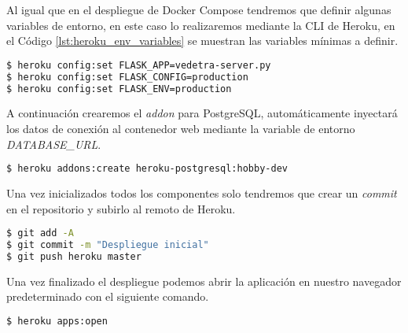 \documentclass[../proyecto.tex]{subfiles}
\begin{document}
Al igual que en el despliegue de Docker Compose tendremos que definir algunas variables de entorno, en este caso lo realizaremos mediante la CLI de Heroku, en el Código \ref{lst:heroku_env_variables} se muestran las variables mínimas a definir.\\

\begin{minipage}{\linewidth}
\begin{lstlisting}[language=bash, caption=Definición de variables de entorno con Heroku CLI, captionpos=b, frame=single, label={lst:heroku_env_variables}]
$ heroku config:set FLASK_APP=vedetra-server.py
$ heroku config:set FLASK_CONFIG=production
$ heroku config:set FLASK_ENV=production
\end{lstlisting}
\end{minipage}

A continuación crearemos el \textit{addon} para PostgreSQL, automáticamente inyectará los datos de conexión al contenedor web mediante la variable de entorno \textit{DATABASE\_URL}.\\

\begin{minipage}{\linewidth}
\begin{lstlisting}[language=bash, caption=Creación del addon Heroku PostgreSQL, captionpos=b, frame=single]
$ heroku addons:create heroku-postgresql:hobby-dev
\end{lstlisting}
\end{minipage}

Una vez inicializados todos los componentes solo tendremos que crear un \textit{commit} en el repositorio y subirlo al remoto de Heroku.\\

\begin{minipage}{\linewidth}
\begin{lstlisting}[language=bash, caption=Despliegue en Heroku, captionpos=b, frame=single]
$ git add -A
$ git commit -m "Despliegue inicial"
$ git push heroku master
\end{lstlisting}
\end{minipage}

Una vez finalizado el despliegue podemos abrir la aplicación en nuestro navegador predeterminado con el siguiente comando.\\

\begin{minipage}{\linewidth}
\begin{lstlisting}[language=bash, caption=Abrir aplicación de Heroku desde la CLI, captionpos=b, frame=single]
$ heroku apps:open
\end{lstlisting}
\end{minipage}
\end{document}
